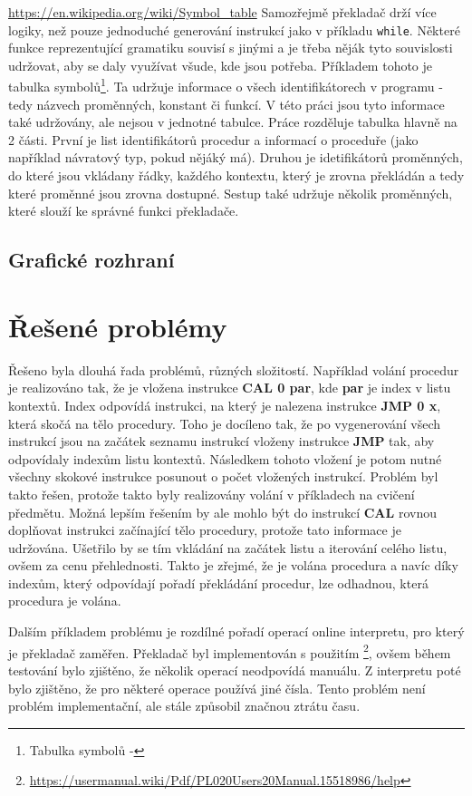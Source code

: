 \documentclass[12pt, letterpaper]{article}
\begin{document}
%
\urldef{\urlC}\url{https://en.wikipedia.org/wiki/Symbol_table}
Samozřejmě překladač drží více logiky, než pouze jednoduché generování instrukcí jako v příkladu \texttt{while}. Některé
funkce reprezentující gramatiku souvisí s jinými a je třeba něják tyto souvislosti udržovat, aby se daly využívat všude,
kde jsou potřeba. Příkladem tohoto je tabulka symbolů\footnote{Tabulka symbolů - \urlC}. Ta udržuje informace o všech identifikátorech v
programu - tedy názvech proměnných, konstant či funkcí. V této práci jsou tyto informace také udržovány, ale nejsou v
jednotné tabulce. Práce rozděluje tabulka hlavně na 2 části. První je list identifikátorů procedur a informací o 
proceduře (jako například návratový typ, pokud nějáký má). Druhou je  idetifikátorů proměnných, do které jsou
vkládany řádky, každého kontextu, který je zrovna překládán a tedy které proměnné jsou zrovna dostupné. Sestup také 
udržuje několik  proměnných, které slouží ke správné funkci překladače.
%
\subsection{Grafické rozhraní}
%
\section{Řešené problémy}
Řešeno byla dlouhá řada problémů, různých složitostí. Například volání procedur je realizováno tak, že je vložena
instrukce \textbf{CAL 0 par}, kde \textbf{par} je index v listu kontextů. Index odpovídá instrukci, na který je nalezena
instrukce \textbf{JMP 0 x}, která skočá na tělo procedury. Toho je docíleno tak, že po vygenerování všech instrukcí jsou
na začátek seznamu instrukcí vloženy instrukce \textbf{JMP} tak, aby odpovídaly indexům listu kontextů. Následkem tohoto
vložení je potom nutné všechny skokové instrukce posunout o počet vložených instrukcí. Problém byl takto řešen, protože
takto byly realizovány volání v příkladech na cvičení předmětu. Možná lepším řešením by ale mohlo být do instrukcí 
\textbf{CAL} rovnou doplňovat instrukci začínající tělo procedury, protože tato informace je udržována. Ušetřilo by
se tím vkládání na začátek listu a iterování celého listu, ovšem za cenu přehlednosti. Takto je zřejmé, že je volána
procedura a navíc díky indexům, který odpovídají pořadí překládání procedur, lze odhadnou, která procedura je volána.

Dalším příkladem problému je rozdílné pořadí operací online interpretu, pro který je překladač zaměřen. Překladač byl
implementován s použitím \footnote{\url{https://usermanual.wiki/Pdf/PL020Users20Manual.15518986/help}},
ovšem během testování bylo zjištěno, že několik operací neodpovídá manuálu. Z interpretu poté bylo zjištěno, že pro
některé operace používá jiné čísla. Tento problém není problém implementační, ale stále způsobil značnou ztrátu času.
\end{document}
